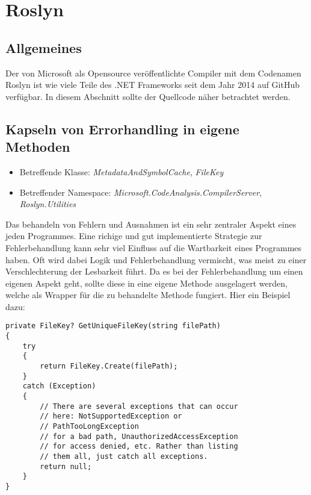 \section{Roslyn}
\subsection{Allgemeines}
Der von Microsoft als Opensource veröffentlichte Compiler mit dem Codenamen Roslyn ist wie viele Teile des .NET Frameworks seit dem Jahr 2014 auf GitHub verfügbar. In diesem Abschnitt sollte der Quellcode näher betrachtet werden. 

\subsection{Kapseln von Errorhandling in eigene Methoden}
\begin{itemize}
	\item Betreffende Klasse: \textit{MetadataAndSymbolCache}, \textit{FileKey}
	\item Betreffender Namespace: \textit{Microsoft.CodeAnalysis.CompilerServer}, \textit{Roslyn.Utilities}
\end{itemize}

Das behandeln von Fehlern und Ausnahmen ist ein sehr zentraler Aspekt eines jeden Programmes. Eine richige und gut implementierte Strategie zur Fehlerbehandlung kann sehr viel Einfluss auf die Wartbarkeit eines Programmes haben. Oft wird dabei Logik und Fehlerbehandlung vermischt, was meist zu einer Verschlechterung der Lesbarkeit führt. Da es bei der Fehlerbehandlung um einen eigenen Aspekt geht, sollte diese in eine eigene Methode ausgelagert werden, welche als Wrapper für die zu behandelte Methode fungiert. Hier ein Beispiel dazu:

\begin{lstlisting}[language={[Sharp]C}, caption=Beispiele für getrennten Aspket der Fehlerbehandlung, label=lst:AspectedErrorhandling]
private FileKey? GetUniqueFileKey(string filePath)
{
	try
	{
		return FileKey.Create(filePath);
	}
	catch (Exception)
	{
		// There are several exceptions that can occur 
		// here: NotSupportedException or 
		// PathTooLongException
		// for a bad path, UnauthorizedAccessException 
		// for access denied, etc. Rather than listing
		// them all, just catch all exceptions.
		return null;
	}
}
\end{lstlisting}


